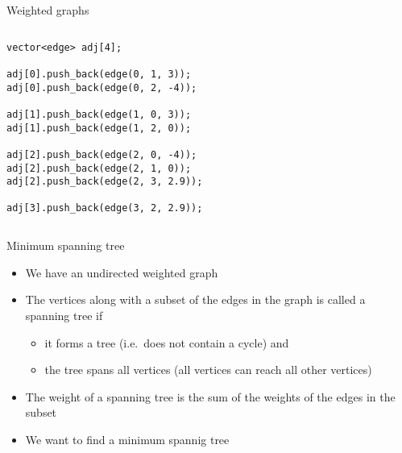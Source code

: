 \documentclass[12pt,t]{beamer}
\newcommand{\bi}{\begin{itemize}}
\newcommand{\ei}{\end{itemize}}
\begin{document}
\begin{frame}[fragile]{Weighted graphs}
    \begin{columns}[T]
        \begin{column}{.4\textwidth}
            \begin{verbatim}
vector<edge> adj[4];

adj[0].push_back(edge(0, 1, 3));
adj[0].push_back(edge(0, 2, -4));

adj[1].push_back(edge(1, 0, 3));
adj[1].push_back(edge(1, 2, 0));

adj[2].push_back(edge(2, 0, -4));
adj[2].push_back(edge(2, 1, 0));
adj[2].push_back(edge(2, 3, 2.9));

adj[3].push_back(edge(3, 2, 2.9));

            \end{verbatim}
        \end{column}%
        \hfill%
        \begin{column}{.6\textwidth}
            \begin{figure}
            \end{figure}
        \end{column}%
    \end{columns}
\end{frame}

\begin{frame}{Minimum spanning tree}
    \vspace{20pt}
    \bi
        \item We have an undirected weighted graph
        \item The vertices along with a subset of the edges in the graph is called a spanning tree if
            \bi
                \item it forms a tree (i.e.\ does not contain a cycle) and
                \item the tree spans all vertices (all vertices can reach all other vertices)
            \ei
        \vspace{10pt}
        \item The weight of a spanning tree is the sum of the weights of the edges in the subset
        \vspace{10pt}
        \item We want to find a minimum spannig tree
    \ei
\end{frame}
\end{document}
